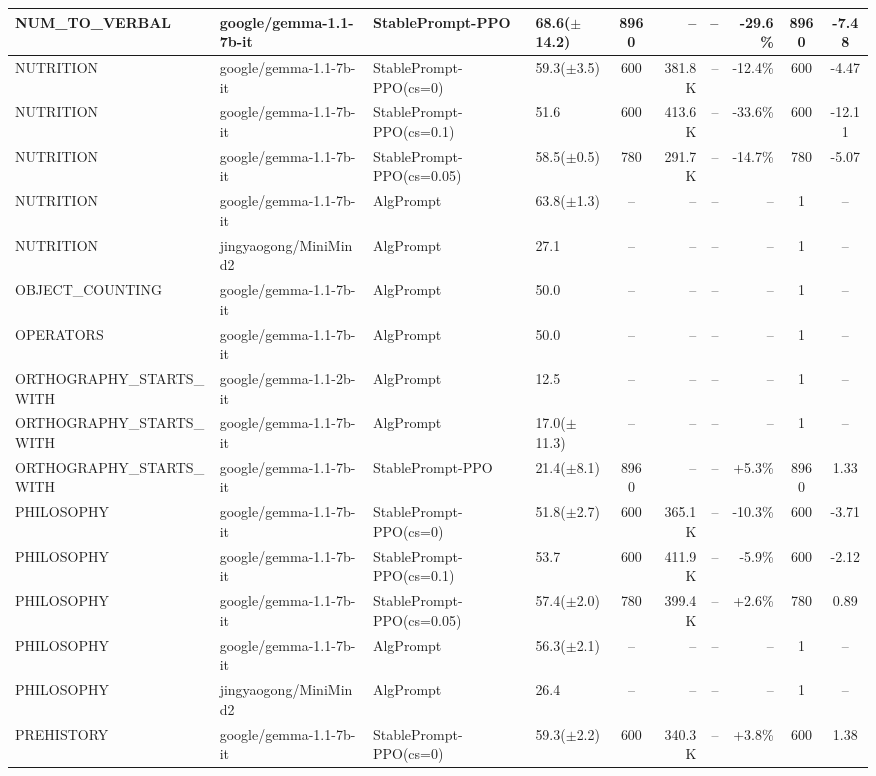 {\begin{longtable}{@{}p{5.5cm}p{4.5cm}p{2.5cm}lcrrrcc@{}}
NUM\_TO\_VERBAL & google/gemma-1.1-7b-it & StablePrompt-PPO & 68.6($\pm$14.2) & 8960 & -- & -- & -29.6\% & 8960 & -7.48 \\
\midrule
NUTRITION & google/gemma-1.1-7b-it & StablePrompt-PPO(cs=0) & 59.3($\pm$3.5) & 600 & 381.8K & -- & -12.4\% & 600 & -4.47 \\
NUTRITION & google/gemma-1.1-7b-it & StablePrompt-PPO(cs=0.1) & 51.6 & 600 & 413.6K & -- & -33.6\% & 600 & -12.11 \\
NUTRITION & google/gemma-1.1-7b-it & StablePrompt-PPO(cs=0.05) & 58.5($\pm$0.5) & 780 & 291.7K & -- & -14.7\% & 780 & -5.07 \\
NUTRITION & google/gemma-1.1-7b-it & AlgPrompt & 63.8($\pm$1.3) & -- & -- & -- & -- & 1 & -- \\
\midrule
NUTRITION & jingyaogong/MiniMind2 & AlgPrompt & 27.1 & -- & -- & -- & -- & 1 & -- \\
\midrule
OBJECT\_COUNTING & google/gemma-1.1-7b-it & AlgPrompt & 50.0 & -- & -- & -- & -- & 1 & -- \\
\midrule
OPERATORS & google/gemma-1.1-7b-it & AlgPrompt & 50.0 & -- & -- & -- & -- & 1 & -- \\
\midrule
ORTHOGRAPHY\_STARTS\_WITH & google/gemma-1.1-2b-it & AlgPrompt & 12.5 & -- & -- & -- & -- & 1 & -- \\
\midrule
ORTHOGRAPHY\_STARTS\_WITH & google/gemma-1.1-7b-it & AlgPrompt & 17.0($\pm$11.3) & -- & -- & -- & -- & 1 & -- \\
ORTHOGRAPHY\_STARTS\_WITH & google/gemma-1.1-7b-it & StablePrompt-PPO & 21.4($\pm$8.1) & 8960 & -- & -- & +5.3\% & 8960 & 1.33 \\
\midrule
PHILOSOPHY & google/gemma-1.1-7b-it & StablePrompt-PPO(cs=0) & 51.8($\pm$2.7) & 600 & 365.1K & -- & -10.3\% & 600 & -3.71 \\
PHILOSOPHY & google/gemma-1.1-7b-it & StablePrompt-PPO(cs=0.1) & 53.7 & 600 & 411.9K & -- & -5.9\% & 600 & -2.12 \\
PHILOSOPHY & google/gemma-1.1-7b-it & StablePrompt-PPO(cs=0.05) & 57.4($\pm$2.0) & 780 & 399.4K & -- & +2.6\% & 780 & 0.89 \\
PHILOSOPHY & google/gemma-1.1-7b-it & AlgPrompt & 56.3($\pm$2.1) & -- & -- & -- & -- & 1 & -- \\
\midrule
PHILOSOPHY & jingyaogong/MiniMind2 & AlgPrompt & 26.4 & -- & -- & -- & -- & 1 & -- \\
\midrule
PREHISTORY & google/gemma-1.1-7b-it & StablePrompt-PPO(cs=0) & 59.3($\pm$2.2) & 600 & 340.3K & -- & +3.8\% & 600 & 1.38 \\

\end{longtable}}

